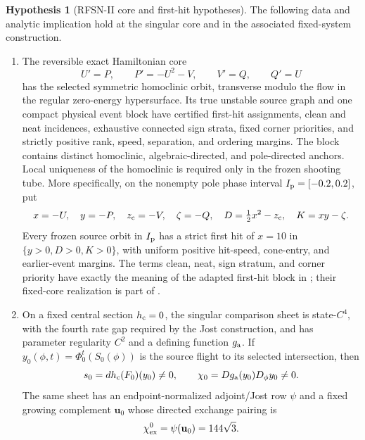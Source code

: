 \documentclass[11pt,reqno]{amsart}
\numberwithin{equation}{section}
\theoremstyle{definition}
\newtheorem{hypothesis}[theorem]{Hypothesis}
\theoremstyle{remark}
\begin{document}
\begin{hypothesis}[RFSN-II core and first-hit hypotheses]\label{hyp:H}
The following data and analytic implication hold at the singular core and in
the associated fixed-system construction.
\begin{enumerate}
 \item[${\rm(H_{core})}$]
 The reversible exact Hamiltonian core
 \begin{equation}\label{eq:core}
  U'=P,\qquad P'=-U^2-V,\qquad V'=Q,\qquad Q'=U
 \end{equation}
 has the selected symmetric homoclinic orbit, transverse modulo the flow in
 the regular zero-energy hypersurface.  Its true unstable source graph and
 one compact physical event block have certified first-hit assignments,
 clean and neat incidences, exhaustive connected sign strata, fixed corner
 priorities, and strictly positive rank, speed, separation, and ordering
 margins.  The block contains distinct homoclinic, algebraic-directed, and
 pole-directed anchors.  Local uniqueness of the homoclinic is required only
 in the frozen shooting tube.  More specifically, on the nonempty pole phase
 interval $I_{\rm p}=[-0.2,0.2]$, put
 \[
  x=-U,\quad y=-P,\quad z_{\rm c}=-V,\quad\zeta=-Q,\quad
  D=\tfrac12x^2-z_{\rm c},\quad K=xy-\zeta .
 \]
 Every frozen source orbit in $I_{\rm p}$ has a strict first hit of $x=10$
 in $\{y>0,D>0,K>0\}$, with uniform positive hit-speed, cone-entry, and
 earlier-event margins.
 The terms clean, neat, sign stratum, and corner priority have exactly the
 meaning of the adapted first-hit block in
 \cite[Definition~2.5 and Proposition~2.8]{LuHighWinding2026}; their
 fixed-core realization is part of
 \cite[Theorem~6.3]{LuHighWinding2026}.
 \item[${\rm(H_{Jost})}$]
 On a fixed central section $h_{\rm c}=0$, the singular comparison sheet is
 state-$C^4$, with the fourth rate gap required by the Jost construction, and
 has parameter regularity $C^2$ and a defining function $g_{\rm a}$.  If
 $y_0(\phi,t)=\Phi_0^t(S_0(\phi))$ is the source flight to its selected
 intersection, then
 \begin{equation}\label{eq:source-incidence-core}
  s_0=dh_{\rm c}(F_0)(y_0)\ne0,\qquad
  \chi_0=Dg_{\rm a}(y_0)D_\phi y_0\ne0.
 \end{equation}
 The same sheet has an endpoint-normalized adjoint/Jost row $\psi$ and a
 fixed growing complement $\mathbf u_0$ whose directed exchange pairing is
 \begin{equation}\label{eq:exchange-core}
   \chi_{\rm ex}^0=\psi(\mathbf u_0)=144\sqrt3.

\end{equation}
\end{enumerate}
\end{hypothesis}
\end{document}
